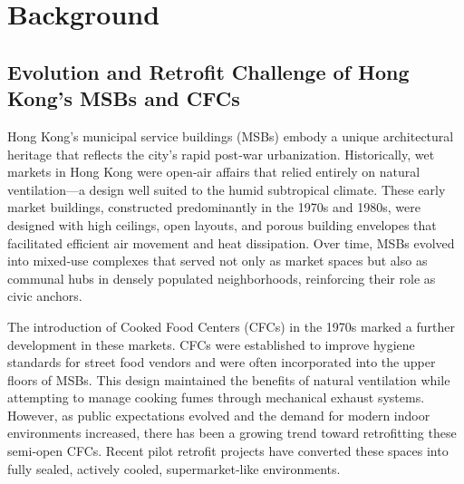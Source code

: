 \documentclass[preprint,12pt]{elsarticle}
\begin{document}
    

\section{Background}
\subsection{Evolution and Retrofit Challenge of Hong Kong’s MSBs and CFCs}    
    Hong Kong’s municipal service buildings (MSBs) embody a unique architectural heritage that reflects the city’s rapid post‐war urbanization. Historically, wet markets in Hong Kong were open‐air affairs that relied entirely on natural ventilation—a design well suited to the humid subtropical climate\cite{1}. These early market buildings, constructed predominantly in the 1970s and 1980s, were designed with high ceilings, open layouts, and porous building envelopes that facilitated efficient air movement and heat dissipation\cite{1,2}. Over time, MSBs evolved into mixed‐use complexes that served not only as market spaces but also as communal hubs in densely populated neighborhoods, reinforcing their role as civic anchors\cite{3}.
    
    The introduction of Cooked Food Centers (CFCs) in the 1970s marked a further development in these markets. CFCs were established to improve hygiene standards for street food vendors and were often incorporated into the upper floors of MSBs. This design maintained the benefits of natural ventilation while attempting to manage cooking fumes through mechanical exhaust systems\cite{2,3}. However, as public expectations evolved and the demand for modern indoor environments increased, there has been a growing trend toward retrofitting these semi‐open CFCs. Recent pilot retrofit projects have converted these spaces into fully sealed, actively cooled, supermarket‐like environments\cite{4}.
\end{document}
